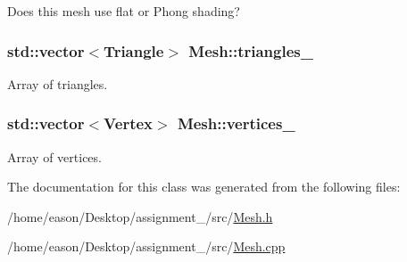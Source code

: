 Does this mesh use flat or Phong shading? 

\subsubsection[{\texorpdfstring{triangles\+\_\+}{triangles_}}]{\setlength{\rightskip}{0pt plus 5cm}std\+::vector$<${\bf Triangle}$>$ Mesh\+::triangles\+\_\+\hspace{0.3cm}{\ttfamily [private]}}\hypertarget{classMesh_a13455b3ace274f1d3d36ee45c7a3988d}{}\label{classMesh_a13455b3ace274f1d3d36ee45c7a3988d}


Array of triangles. 

\subsubsection[{\texorpdfstring{vertices\+\_\+}{vertices_}}]{\setlength{\rightskip}{0pt plus 5cm}std\+::vector$<${\bf Vertex}$>$ Mesh\+::vertices\+\_\+\hspace{0.3cm}{\ttfamily [private]}}\hypertarget{classMesh_a986edf1ab1d37e517ff8adc928519528}{}\label{classMesh_a986edf1ab1d37e517ff8adc928519528}


Array of vertices. 



The documentation for this class was generated from the following files\+:\begin{DoxyCompactItemize}
\item 
/home/eason/\+Desktop/assignment\+\_/src/\hyperlink{Mesh_8h}{Mesh.\+h}\item 
/home/eason/\+Desktop/assignment\+\_/src/\hyperlink{Mesh_8cpp}{Mesh.\+cpp}\end{DoxyCompactItemize}
